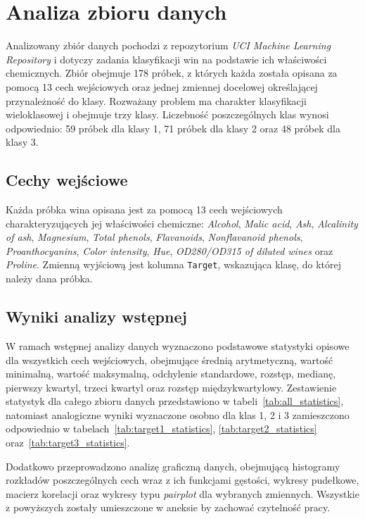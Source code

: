 \section{Analiza zbioru danych}

Analizowany zbiór danych pochodzi z repozytorium \textit{UCI Machine Learning Repository} i dotyczy zadania klasyfikacji win na podstawie ich właściwości chemicznych. Zbiór obejmuje 178 próbek, z których każda została opisana za pomocą 13 cech wejściowych oraz jednej zmiennej docelowej określającej przynależność do klasy. Rozważany problem ma charakter klasyfikacji wieloklasowej i obejmuje trzy klasy. Liczebność poszczególnych klas wynosi odpowiednio: 59 próbek dla klasy 1, 71 próbek dla klasy 2 oraz 48 próbek dla klasy 3.

\subsection{Cechy wejściowe}

Każda próbka wina opisana jest za pomocą 13 cech wejściowych charakteryzujących jej właściwości chemiczne: \textit{Alcohol}, \textit{Malic acid}, \textit{Ash}, \textit{Alcalinity of ash}, \textit{Magnesium}, \textit{Total phenols}, \textit{Flavanoids}, \textit{Nonflavanoid phenols}, \textit{Proanthocyanins}, \textit{Color intensity}, \textit{Hue}, \textit{OD280/OD315 of diluted wines} oraz \textit{Proline}. Zmienną wyjściową jest kolumna \texttt{Target}, wskazująca klasę, do której należy dana próbka.

\subsection{Wyniki analizy wstępnej}

W ramach wstępnej analizy danych wyznaczono podstawowe statystyki opisowe dla wszystkich cech wejściowych, obejmujące średnią arytmetyczną, wartość minimalną, wartość maksymalną, odchylenie standardowe, rozstęp, medianę, pierwszy kwartyl, trzeci kwartyl oraz rozstęp międzykwartylowy. Zestawienie statystyk dla całego zbioru danych przedstawiono w tabeli~\ref{tab:all_statistics}, natomiast analogiczne wyniki wyznaczone osobno dla klas 1, 2 i 3 zamieszczono odpowiednio w tabelach~\ref{tab:target1_statistics}, \ref{tab:target2_statistics} oraz~\ref{tab:target3_statistics}.

Dodatkowo przeprowadzono analizę graficzną danych, obejmującą histogramy rozkładów poszczególnych cech wraz z ich funkcjami gęstości, wykresy pudełkowe, macierz korelacji oraz wykresy typu \textit{pairplot} dla wybranych zmiennych.
Wszystkie z powyższych zostały umieszczone w aneksie by zachować czytelność pracy.

